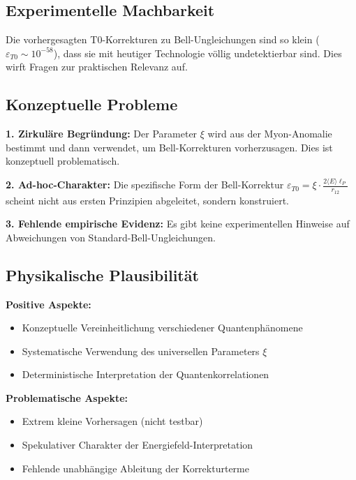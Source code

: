 \documentclass[12pt,a4paper]{article}
\begin{document}
	\begin{critical}
		\subsection{Experimentelle Machbarkeit}
		
		Die vorhergesagten T0-Korrekturen zu Bell-Ungleichungen sind so klein ($\varepsilon_{T0} \sim 10^{-58}$), dass sie mit heutiger Technologie v\"ollig undetektierbar sind. Dies wirft Fragen zur praktischen Relevanz auf.
		
		\subsection{Konzeptuelle Probleme}
		
		\textbf{1. Zirkul\"are Begr\"undung:}
		Der Parameter $\xi$ wird aus der Myon-Anomalie bestimmt und dann verwendet, um Bell-Korrekturen vorherzusagen. Dies ist konzeptuell problematisch.
		
		\textbf{2. Ad-hoc-Charakter:}
		Die spezifische Form der Bell-Korrektur $\varepsilon_{T0} = \xi \cdot \frac{2\langle E \rangle \ell_P}{r_{12}}$ scheint nicht aus ersten Prinzipien abgeleitet, sondern konstruiert.
		
		\textbf{3. Fehlende empirische Evidenz:}
		Es gibt keine experimentellen Hinweise auf Abweichungen von Standard-Bell-Ungleichungen.
		
		\subsection{Physikalische Plausibilit\"at}
		
		\textbf{Positive Aspekte:}
		\begin{itemize}
			\item Konzeptuelle Vereinheitlichung verschiedener Quantenph\"anomene
			\item Systematische Verwendung des universellen Parameters $\xi$
			\item Deterministische Interpretation der Quantenkorrelationen
		\end{itemize}
		
		\textbf{Problematische Aspekte:}
		\begin{itemize}
			\item Extrem kleine Vorhersagen (nicht testbar)
			\item Spekulativer Charakter der Energiefeld-Interpretation
			\item Fehlende unabh\"angige Ableitung der Korrekturterme
		\end{itemize}
	\end{critical}
	
\end{document}
